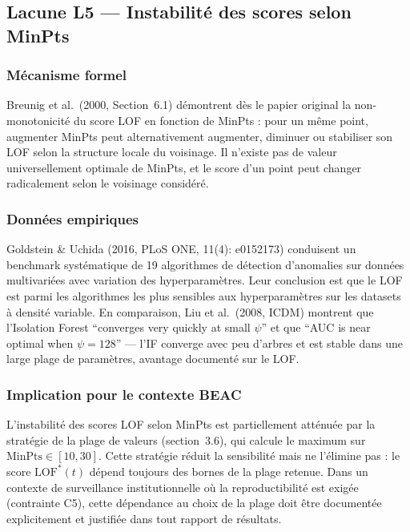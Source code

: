 \documentclass[12pt,a4paper]{article}
\begin{document}
\subsection{Lacune L5 --- Instabilité des scores selon MinPts}

\subsubsection{Mécanisme formel}

Breunig et al.\ (2000, Section~6.1) démontrent dès le papier original la
non-monotonicité du score LOF en fonction de MinPts : pour un même point,
augmenter MinPts peut alternativement augmenter, diminuer ou stabiliser son
LOF selon la structure locale du voisinage. Il n'existe pas de valeur
universellement optimale de MinPts, et le score d'un point peut changer
radicalement selon le voisinage considéré.

\subsubsection{Données empiriques}

Goldstein \& Uchida (2016, PLoS ONE, 11(4): e0152173) conduisent un benchmark
systématique de 19 algorithmes de détection d'anomalies sur données
multivariées avec variation des hyperparamètres. Leur conclusion est que le
LOF est parmi les algorithmes les plus sensibles aux hyperparamètres sur les
datasets à densité variable. En comparaison, Liu et al.\ (2008, ICDM) montrent
que l'Isolation Forest ``converges very quickly at small $\psi$'' et que
``AUC is near optimal when $\psi = 128$'' --- l'IF converge avec peu d'arbres
et est stable dans une large plage de paramètres, avantage documenté sur le LOF.

\subsubsection{Implication pour le contexte BEAC}

L'instabilité des scores LOF selon MinPts est partiellement atténuée par la
stratégie de la plage de valeurs (section~3.6), qui calcule le maximum sur
$\mathrm{MinPts} \in [10, 30]$. Cette stratégie réduit la sensibilité mais
ne l'élimine pas : le score $\mathrm{LOF}^*(t)$ dépend toujours des bornes
de la plage retenue. Dans un contexte de surveillance institutionnelle où la
reproductibilité est exigée (contrainte C5), cette dépendance au choix de la
plage doit être documentée explicitement et justifiée dans tout rapport de
résultats.
\end{document}
